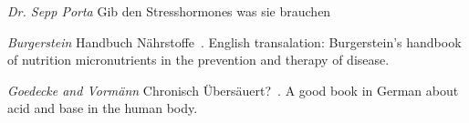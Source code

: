 \documentclass[../main.tex]{subfiles}
\begin{document}
\textit{Dr. Sepp Porta} Gib den Stresshormones was sie brauchen~\cite{PortaStress}

\vspace{5mm}
\noindent\textit{Burgerstein} Handbuch N\"ahrstoffe~\cite{BurgerNutrient}. English transalation:
Burgerstein’s handbook of nutrition micronutrients in the prevention and therapy of disease\cite{BurgerNutE}.

\vspace{5mm}
\noindent\textit{Goedecke and Vorm\"ann} Chronisch \"Ubers\"auert?~\cite{OverAcid}.
A good book in German about acid and base in the human body. 
\end{document}
